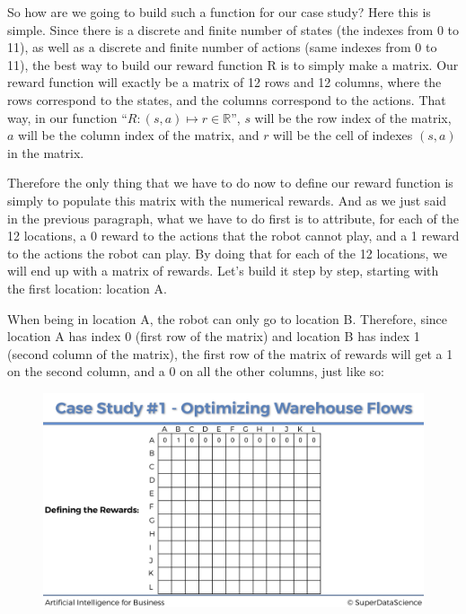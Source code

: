 \documentclass[]{book}
\begin{document}
So how are we going to build such a function for our case study? Here this is simple. Since there is a discrete and finite number of states (the indexes from 0 to 11), as well as a discrete and finite number of actions (same indexes from 0 to 11), the best way to build our reward function R is to simply make a matrix. Our reward function will exactly be a matrix of 12 rows and 12 columns, where the rows correspond to the states, and the columns correspond to the actions. That way, in our function ``\(R : (s,a) \mapsto r \in \mathbb{R}\)'', \(s\) will be the row index of the matrix, \(a\) will be the column index of the matrix, and \(r\) will be the cell of indexes \((s,a)\) in the matrix.

Therefore the only thing that we have to do now to define our reward function is simply to populate this matrix with the numerical rewards. And as we just said in the previous paragraph, what we have to do first is to attribute, for each of the 12 locations, a 0 reward to the actions that the robot cannot play, and a 1 reward to the actions the robot can play. By doing that for each of the 12 locations, we will end up with a matrix of rewards. Let's build it step by step, starting with the first location: location A.

When being in location A, the robot can only go to location B. Therefore, since location A has index 0 (first row of the matrix) and location B has index 1 (second column of the matrix), the first row of the matrix of rewards will get a 1 on the second column, and a 0 on all the other columns, just like so:

\begin{figure}[!htbp]
        \begin{center}
            \includegraphics[scale=0.175]{Rewards_Matrix_1.png}
        \end{center}
\end{figure}
\end{document}
